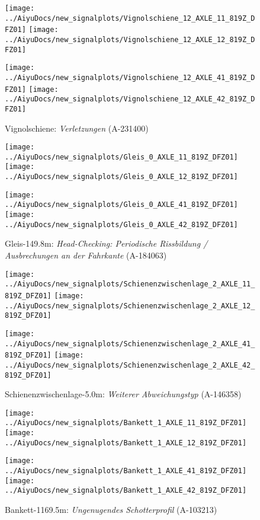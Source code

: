 \begin{figure}[H]
	\centering
	\texttt{[image: ../AiyuDocs/new\_signalplots/Vignolschiene\_12\_AXLE\_11\_819Z\_DFZ01]}
	\texttt{[image: ../AiyuDocs/new\_signalplots/Vignolschiene\_12\_AXLE\_12\_819Z\_DFZ01]}
	
	\texttt{[image: ../AiyuDocs/new\_signalplots/Vignolschiene\_12\_AXLE\_41\_819Z\_DFZ01]}
	\texttt{[image: ../AiyuDocs/new\_signalplots/Vignolschiene\_12\_AXLE\_42\_819Z\_DFZ01]}
	\caption{Vignolschiene: \textit{Verletzungen} (A-231400)}
\end{figure}

\begin{figure}[H]
	\centering
	\texttt{[image: ../AiyuDocs/new\_signalplots/Gleis\_0\_AXLE\_11\_819Z\_DFZ01]}
	\texttt{[image: ../AiyuDocs/new\_signalplots/Gleis\_0\_AXLE\_12\_819Z\_DFZ01]}
	
	\texttt{[image: ../AiyuDocs/new\_signalplots/Gleis\_0\_AXLE\_41\_819Z\_DFZ01]}
	\texttt{[image: ../AiyuDocs/new\_signalplots/Gleis\_0\_AXLE\_42\_819Z\_DFZ01]}
	\caption{Gleis-149.8m: \textit{Head-Checking: Periodische Rissbildung / Ausbrechungen an der Fahrkante} (A-184063)}
\end{figure}

\begin{figure}[H]
	\centering
	\texttt{[image: ../AiyuDocs/new\_signalplots/Schienenzwischenlage\_2\_AXLE\_11\_819Z\_DFZ01]}
	\texttt{[image: ../AiyuDocs/new\_signalplots/Schienenzwischenlage\_2\_AXLE\_12\_819Z\_DFZ01]}
	
	\texttt{[image: ../AiyuDocs/new\_signalplots/Schienenzwischenlage\_2\_AXLE\_41\_819Z\_DFZ01]}
	\texttt{[image: ../AiyuDocs/new\_signalplots/Schienenzwischenlage\_2\_AXLE\_42\_819Z\_DFZ01]}
	\caption{Schienenzwischenlage-5.0m: \textit{Weiterer Abweichungstyp} (A-146358)}
\end{figure}

\begin{figure}[H]
	\centering
	\texttt{[image: ../AiyuDocs/new\_signalplots/Bankett\_1\_AXLE\_11\_819Z\_DFZ01]}
	\texttt{[image: ../AiyuDocs/new\_signalplots/Bankett\_1\_AXLE\_12\_819Z\_DFZ01]}
	
	\texttt{[image: ../AiyuDocs/new\_signalplots/Bankett\_1\_AXLE\_41\_819Z\_DFZ01]}
	\texttt{[image: ../AiyuDocs/new\_signalplots/Bankett\_1\_AXLE\_42\_819Z\_DFZ01]}
	\caption{Bankett-1169.5m: \textit{Ungenugendes Schotterprofil} (A-103213)}
\end{figure}

